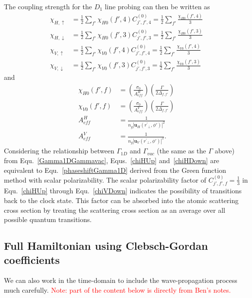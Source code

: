 \documentclass[]{report}
\begin{document}
The coupling strength for the $ D_1 $ line probing can then be written as
\begin{align}
\chi_{H,\uparrow} &=   \frac{1}{2} \sum_{f'} \chi_{H0}(f',4) C_{j',f',4}^{(0)}  =  \frac{1}{2} \sum_{f'} \frac{\chi_{H0}(f',4)}{3} \label{chiHUp}  \\
\chi_{H,\downarrow} &=   \frac{1}{2} \sum_{f'} \chi_{H0}(f',3)  C_{j',f',3}^{(0)} = \frac{1}{2} \sum_{f'} \frac{\chi_{H0}(f',3) }{3} \label{chiHDown}\\
\chi_{V,\uparrow} &=   \frac{1}{2} \sum_{f'} \chi_{V0}(f',4)  C_{j',f',4}^{(0)}  =   \frac{1}{2} \sum_{f'} \frac{\chi_{V0}(f',4)}{3}\label{chiVUp}  \\
\chi_{V,\downarrow} &=   \frac{1}{2} \sum_{f'} \chi_{V0}(f',3)  C_{j',f',3}^{(0)}=   \frac{1}{2} \sum_{f'} \frac{\chi_{V0}(f',3) }{3} \label{chiVDown}
\end{align}
and 
\begin{align}
\chi_{H0}(f',f) &= \left( \frac{ \sigma_0}{A_{ef\!f}^H} \right) \left( \frac{\Gamma}{2 \Delta_{f,f'}} \right)\\
\chi_{V0}(f',f) &= \left( \frac{ \sigma_0}{A_{ef\!f}^V} \right) \left( \frac{\Gamma}{2 \Delta_{f,f'}} \right)\\
A_{ef\!f}^H &= \frac{1}{n_g|\mathbf{u}_{H}(r^\prime\!\!_\perp,\phi')|^2}\\
A_{ef\!f}^V &= \frac{1}{n_g | \mathbf{u}_{V}(r^\prime\!\!_\perp,\phi')|^2}.\label{eq:AeffV}
\end{align}
Considering the relationship between $ \Gamma_{1D} $ and $ \Gamma_{vac} $ (the same as the $ \Gamma $ above) from Equ.~\eqref{Gamma1DGammavac}, Equs.~\eqref{chiHUp} and~\eqref{chiHDown} are equivalent to Equ.~\eqref{phaseshiftGamma1D} derived from the Green function method with scalar polarizability. The scalar polarizability factor of $ C_{j',f',f}^{(0)}=\frac{1}{3} $ in Equ.~\eqref{chiHUp} through Equ.~\eqref{chiVDown} indicates the possibility of transitions back to the clock state. This factor can be absorbed into the atomic scattering cross section by treating the scattering cross section as an average over all possible quantum transitions. 

\subsection{Full Hamiltonian using Clebsch-Gordan coefficients}
We can also work in the time-domain to include the wave-propagation process much carefully. \textcolor{red}{Note: part of the content below is directly from Ben's notes.}
\end{document}
